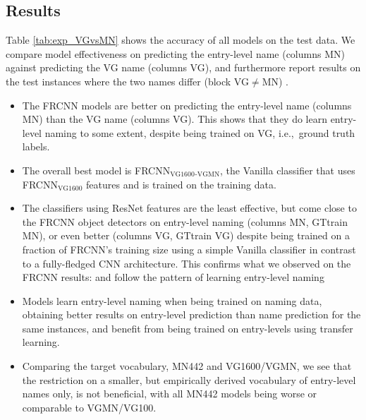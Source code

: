 

\subsection{Results}
\label{sect:exp_results}


Table \ref{tab:exp_VGvsMN} shows the accuracy of all models on the \mn test data. 
We compare model effectiveness on predicting the entry-level name (columns MN) against predicting the \arbitrary VG name (columns VG), and furthermore report results on the test instances where the two names differ (block VG$\neq$MN) . 
\begin{itemize}
	\item The FRCNN models  are better on predicting the entry-level name (columns MN) than the \arbitrary VG name (columns VG). 
	This shows that they do learn entry-level naming to some extent, despite being trained on VG, i.e.,~\arbitrary ground truth labels.
	\item The overall best model is FRCNN$_\text{VG1600}$$_\text{-VGMN}$, the Vanilla classifier that uses  FRCNN$_\text{VG1600}$ features and is trained on the \mn training data. 
	\item {} The classifiers using ResNet features are the least effective, but come close to the FRCNN object detectors on entry-level naming (columns MN, GTtrain MN), or even better  (columns VG, GTtrain VG) despite being trained on a fraction of FRCNN's training size using a simple Vanilla classifier in contrast to a fully-fledged CNN architecture.
	This confirms what we observed on the FRCNN results: and follow the pattern of learning entry-level naming  
	\item Models learn entry-level naming when being trained on \arbitrary naming data, obtaining better results on entry-level prediction than \arbitrary name prediction for the same instances, and benefit from being trained on entry-levels using transfer learning. 
	\item Comparing the target vocabulary, MN442 and VG1600/VGMN, we see that the restriction on a smaller, but empirically derived vocabulary of entry-level names only, is not beneficial, with all MN442 models being worse or comparable to VGMN/VG100.
\end{itemize}


